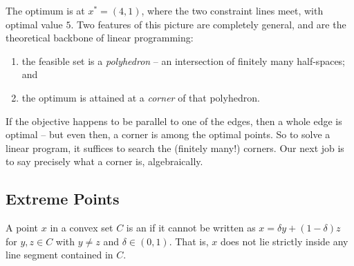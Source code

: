 \begin{center}
\end{center}

The optimum is at $x^* = (4,1)$, where the two constraint lines meet, with optimal value $5$. Two features of this picture are completely general, and are the theoretical backbone of linear programming:
\begin{enumerate}[label=(\roman*)]
    \item the feasible set is a \emph{polyhedron} -- an intersection of finitely many half-spaces; and
    \item the optimum is attained at a \emph{corner} of that polyhedron.
\end{enumerate}
If the objective happens to be parallel to one of the edges, then a whole edge is optimal -- but even then, a corner is among the optimal points. So to solve a linear program, it suffices to search the (finitely many!) corners. Our next job is to say precisely what a corner is, algebraically.

\subsection{Extreme Points}

\begin{definition}
    A point $x$ in a convex set $C$ is an  if it cannot be written as $x = \delta y + (1 - \delta)z$ for $y, z \in C$ with $y \neq z$ and $\delta \in (0,1)$. That is, $x$ does not lie strictly inside any line segment contained in $C$.
\end{definition}

